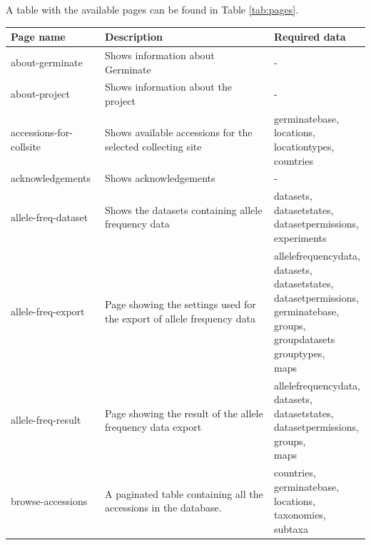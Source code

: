 A table with the available pages can be found in Table \ref{tab:pages}.

\begin{longtable}{p{}p{}p{}}
	\toprule
	\textbf{Page name}     & \textbf{Description} & \textbf{Required data} \\
	\midrule\midrule
	\endhead
	about-germinate        & Shows information about Germinate & - \\ \midrule
	about-project          & Shows information about the project & - \\ \midrule
	accessions-for-collsite & Shows available accessions for the selected collecting site & \cellwrap{germinatebase,\\locations,\\locationtypes,\\countries}\\ \midrule
	acknowledgements       & Shows acknowledgements & - \\ \midrule
	allele-freq-dataset & Shows the datasets containing allele frequency data & \cellwrap{datasets,\\datasetstates,\\datasetpermissions,\\experiments} \\ \midrule
	allele-freq-export  & Page showing the settings used for the export of allele frequency data & \cellwrap{allelefrequencydata,\\datasets,\\datasetstates,\\datasetpermissions,\\germinatebase,\\groups,\\groupdatasets\\grouptypes,\\maps} \\ \midrule
	allele-freq-result  & Page showing the result of the allele frequency data export & \cellwrap{allelefrequencydata,\\datasets,\\datasetstates,\\datasetpermissions,\\groups,\\maps} \\ \midrule
	browse-accessions       & A paginated table containing all the accessions in the database. & \cellwrap{countries,\\germinatebase,\\locations,\\taxonomies,\\subtaxa} \\ \midrule

\end{longtable}

